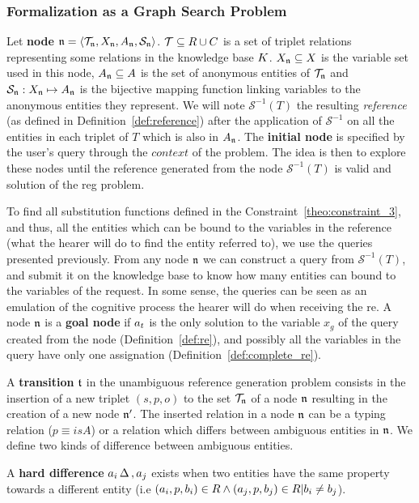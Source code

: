 \documentclass[a4paper,11pt,twoside]{StyleThese}
\begin{document}
\subsubsection{Formalization as a Graph Search Problem}
\label{sec:SCFormalisation}

Let \textbf{node} $\mathfrak{n} = \langle \mathcal{T}_{\mathfrak{n}}, X_{\mathfrak{n}}, A_{\mathfrak{n}}, \mathcal{S}_{\mathfrak{n}} \rangle$. $\mathcal{T} \subseteq R \cup C$ is a set of triplet relations representing some relations in the knowledge base $K$. $X_{\mathfrak{n}} \subseteq X$ is the variable set used in this node, $A_{\mathfrak{n}} \subseteq A$ is the set of anonymous entities of $\mathcal{T}_{\mathfrak{n}}$ and $\mathcal{S}_{\mathfrak{n}}: X_{\mathfrak{n}} \mapsto A_{\mathfrak{n}}$ is the bijective mapping function linking variables to the anonymous entities they represent. We will note $\mathcal{S}^{-1}(T)$ the resulting \textit{reference} (as defined in Definition~\ref{def:reference}) after the application of $\mathcal{S}^{-1}$ on all the entities in each triplet of $T$ which is also in $A_{\mathfrak{n}}$.
The \textbf{initial node} is specified by the user's query through the $context$ of the problem.
The idea is then to explore these nodes until the reference generated from the node $\mathcal{S}^{-1}(T)$ is valid and solution of the \acrshort{reg} problem.
 
To find all substitution functions defined in the Constraint~\ref{theo:constraint_3}, and thus, all the entities which can be bound to the variables in the reference (what the hearer will do to find the entity referred to), we use the \sparql{} queries presented previously. From any node $\mathfrak{n}$ we can construct a \sparql{} query from $\mathcal{S}^{-1}(T)$, and submit it on the knowledge base to know how many entities can bound to the variables of the request. In some sense, the \sparql{} queries can be seen as an emulation of the cognitive process the hearer will do when receiving the \acrshort{re}.
A node $\mathfrak{n}$ is a \textbf{goal node} if $a_t$ is the only solution to the variable $x_g$ of the \sparql{} query created from the node (Definition~\ref{def:re}), and possibly all the variables in the \sparql{} query have only one assignation (Definition~\ref{def:complete_re}).

A \textbf{transition} $\mathfrak{t}$ in the unambiguous reference generation problem consists in the insertion of a new triplet $(s, p, o)$ to the set $\mathcal{T}_{\mathfrak{n}}$ of a node $\mathfrak{n}$ resulting in the creation of a new node $\mathfrak{n}'$. The inserted relation in a node $\mathfrak{n}$ can be a typing relation ($p \equiv isA$) or a relation which differs between ambiguous entities in $\mathfrak{n}$. 
We define two kinds of difference between ambiguous entities.
\begin{definition}
A \textbf{hard difference} $a_i \,\Delta\,, a_j$ exists when two entities have the same property towards a different entity (i.e $(a_i, p, b_i) \in R \land (a_j, p, b_j) \in R | b_i \neq b_j$).
\end{definition}
\end{document}
